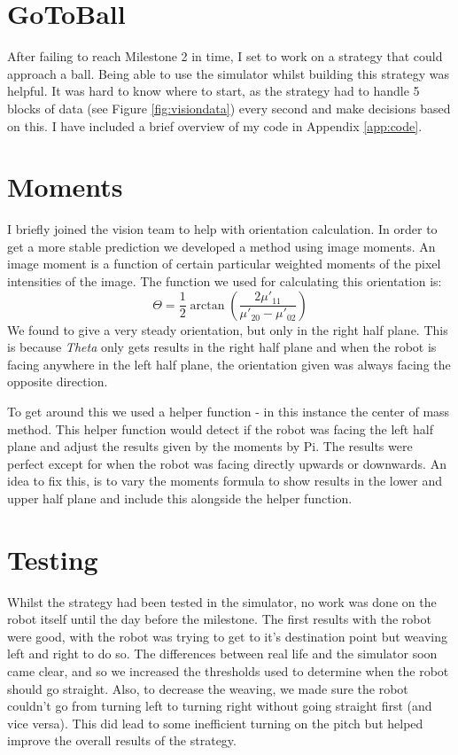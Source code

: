 \documentclass[conference,12pt]{IEEEtran}
\begin{document}
\section{GoToBall}
After failing to reach Milestone 2 in time, I set to work on a strategy that could approach a ball. Being able to use the simulator whilst building this strategy was helpful. It was hard to know where to start, as the strategy had to handle 5 blocks of data (see Figure \ref{fig:visiondata}) every second and make decisions based on this. I have included a brief overview of my code in Appendix \ref{app:code}.

\section{Moments}
I briefly joined the vision team to help with orientation calculation. In order to get a more stable prediction we developed a method using image moments. An image moment is a function of certain particular weighted moments of the pixel intensities of the image. The function we used for calculating this orientation is: 
\begin{equation}
\Theta = \frac{1}{2} \arctan \left( \frac{2\mu'_{11}}{\mu'_{20} - \mu'_{02}} \right)
\end{equation}
We found to give a very steady orientation, but only in the right half plane. This is because \textit{Theta} only gets results in the right half plane and when the robot is facing anywhere in the left half plane, the orientation given was always facing the opposite direction. 

To get around this we used a helper function - in this instance the center of mass method. This helper function would detect if the robot was facing the left half plane and adjust the results given by the moments by Pi. The results were perfect except for when the robot was facing directly upwards or downwards. An idea to fix this, is to vary the moments formula to show results in the lower and upper half plane and include this alongside the helper function.

\section{Testing}
Whilst the strategy had been tested in the simulator, no work was done on the robot itself until the day before the milestone. The first results with the robot were good, with the robot was trying to get to it's destination point but weaving left and right to do so. The differences between real life and the simulator soon came clear, and so we increased the thresholds used to determine when the robot should go straight. Also, to decrease the weaving, we made sure the robot couldn't go from turning left to turning right without going straight first (and vice versa). This did lead to some inefficient turning on the pitch but helped improve the overall results of the strategy.
\end{document}
